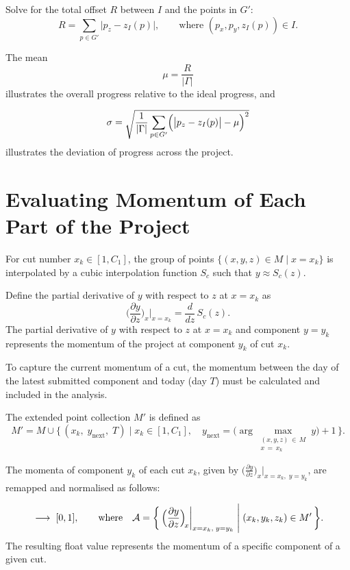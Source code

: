 \documentclass{article}
\begin{document}
Solve for the total offset $R$ between $I$ and the points in $G'$:
\[
    R = \sum_{p \in G'} \bigl|p_z - z_I(p)\bigr|,
    \qquad \text{where } (p_x, p_y, z_I(p)) \in I.
\]

The mean
\[
    \mu = \frac{R}{|\Gamma|}
\]
illustrates the overall progress relative to the ideal progress, and

\[
    \sigma
    = \sqrt{\frac{1}{|\Gamma|}
      \sum_{p \in G'} \Bigl(\bigl|p_z - z_I(p)\bigr| - \mu\Bigr)^{2}}
\]
illustrates the deviation of progress across the project.


\section{Evaluating Momentum of Each Part of the Project}
 
For cut number $x_k \in [1, C_1]$, the group of points
$\{(x, y, z) \in M \mid x = x_k\}$
is interpolated by a cubic interpolation function $S_c$ such that $y \approx S_c(z)$.
 
Define the partial derivative of $y$ with respect to $z$ at $x = x_k$ as
\[
    \biggl(\frac{\partial y}{\partial z}\biggr)_{\!x}\Bigg|_{x = x_k}
    = \frac{d}{dz}\,S_c(z).
\]
The partial derivative of $y$ with respect to $z$ at $x = x_k$ and component
$y = y_k$ represents the momentum of the project at component $y_k$ of cut $x_k$.
 
To capture the current momentum of a cut, the momentum between the day of the
latest submitted component and today (day $T$) must be calculated and included
in the analysis.

The extended point collection $M'$ is defined as
\begin{equation*}
    M' = M \cup \bigl\{\,(x_k,\; y_{\text{next}},\; T)
        \;\big|\;
        x_k \in [1, C_1],\quad
        y_{\text{next}} = \bigl(\arg\max_{\substack{(x,y,z)\,\in\, M \\ x\,=\,x_k}} y\bigr) + 1
    \,\bigr\}.
\end{equation*}
 
The momenta of component $y_k$ of each cut $x_k$, given by
$\displaystyle\biggl(\frac{\partial y}{\partial z}\biggr)_{\!x}\bigg|_{x=x_k,\; y=y_k}$,
are remapped and normalised as follows:

\begin{equation*}
    [\min(\mathcal{A}),\; \max(\mathcal{A})] \;\longrightarrow\; [0, 1],
    \qquad
    \text{where}\quad
    \mathcal{A} = \biggl\{\,
        \Bigl(\frac{\partial y}{\partial z}\Bigr)_{\!x}\bigg|_{x=x_k,\; y=y_k}
        \;\Bigg|\;
        (x_k, y_k, z_k) \in M'
    \,\biggr\}.
\end{equation*}
The resulting float value represents the momentum of a specific component of a given cut.
 
\end{document}
